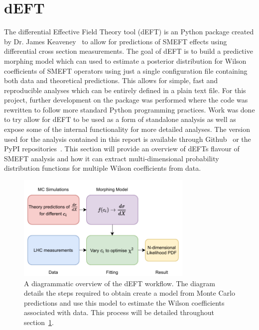 \documentclass[a4paper,11pt]{article}
\begin{document}
\section{dEFT}\label{sec:deft}

The differential Effective Field Theory tool (dEFT) is an Python package created by Dr. James Keaveney~\cite{Keaveney_dEFT} to allow for predictions of SMEFT effects using differential cross section measurements.
The goal of dEFT is to build a predictive morphing model which can used to estimate a posterior distribution for Wilson coefficients of SMEFT operators using just a single configuration file containing both data and theoretical predictions.
This allows for simple, fast and reproducible analyses which can be entirely defined in a plain text file.
For this project, further development on the package was performed where the code was rewritten to follow more standard Python programming practices.
Work was done to try allow for dEFT to be used as a form of standalone analysis as well as expose some of the internal functionality for more detailed analyses.
The version used for the analysis contained in this report is available through Github~\cite{codecalec_dEFT} or the PyPI repositories~\cite{pypi_dEFT}.
This section will provide an overview of dEFTs flavour of SMEFT analysis and how it can extract multi-dimensional probability distribution functions for multiple Wilson coefficients from data.

\begin{figure}[htb]
    \centering
    \includegraphics[width=0.75\textwidth]{images/deft-workflow.pdf}
    \caption{A diagrammatic overview of the dEFT workflow. The diagram details the steps required to obtain create a model from Monte Carlo predictions and use this model to estimate the Wilson coefficients associated with data. This process will be detailed throughout section~\ref{sec:deft}.}
\end{figure}
\end{document}
